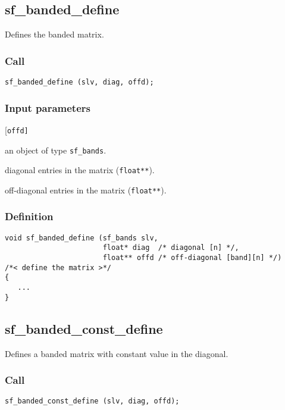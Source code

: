 \subsection{{sf\_banded\_define}}
Defines the banded matrix.

\subsubsection*{Call}
\begin{verbatim}sf_banded_define (slv, diag, offd);\end{verbatim}

\subsubsection*{Input parameters}
\begin{desclist}{\tt }{\quad}[\tt offd]
   \setlength\itemsep{0pt}
   \item[slv]  an object of type \texttt{sf\_bands}. 
   \item[diag] diagonal entries in the matrix (\texttt{float**}).  
   \item[offd] off-diagonal entries in the matrix (\texttt{float**}).  
\end{desclist}

\subsubsection*{Definition}
\begin{verbatim}
void sf_banded_define (sf_bands slv, 
                       float* diag  /* diagonal [n] */, 
                       float** offd /* off-diagonal [band][n] */)
/*< define the matrix >*/
{
   ...
}
\end{verbatim}




\subsection{{sf\_banded\_const\_define}}
Defines a banded matrix with constant value in the diagonal.

\subsubsection*{Call}
\begin{verbatim}sf_banded_const_define (slv, diag, offd);\end{verbatim}


